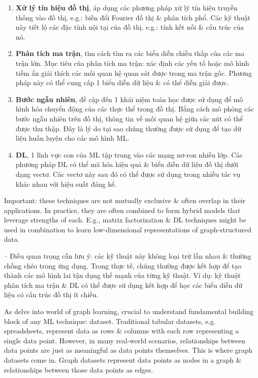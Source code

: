 \documentclass{article}
\begin{document}
\begin{itemize}
\begin{itemize}
        \begin{enumerate}
            \item {\bf Xử lý tín hiệu đồ thị}, áp dụng các phương pháp xử lý tín hiệu truyền thống vào đồ thị, e.g.: biến đổi Fourier đồ thị \& phân tích phổ. Các kỹ thuật này tiết lộ các đặc tính nội tại của đồ thị, e.g.: tính kết nối \& cấu trúc của nó.
            \item {\bf Phân tích ma trận}, tìm cách tìm ra các biểu diễn chiều thấp của các ma trận lớn. Mục tiêu của phân tích ma trận: xác định các yếu tố hoặc mô hình tiềm ẩn giải thích các mối quan hệ quan sát được trong ma trận gốc. Phương pháp này có thể cung cấp 1 biểu diễn dữ liệu \& có thể diễn giải được.
            \item {\bf Bước ngẫu nhiên}, đề cập đến 1 khái niệm toán học được sử dụng để mô hình hóa chuyển động của các thực thể trong đồ thị. Bằng cách mô phỏng các bước ngẫu nhiên trên đồ thị, thông tin về mối quan hệ giữa các nút có thể được thu thập. Đây là lý do tại sao chúng thường được sử dụng để tạo dữ liệu huấn luyện cho các mô hình ML.
            \item {\bf DL}, 1 lĩnh vực con của ML tập trung vào các mạng nơ-ron nhiều lớp. Các phương pháp DL có thể mã hóa hiệu quả \& biểu diễn dữ liệu đồ thị dưới dạng vectơ. Các vectơ này sau đó có thể được sử dụng trong nhiều tác vụ khác nhau với hiệu suất đáng kể.
        \end{enumerate}
        Important: these techniques are not mutually exclusive \& often overlap in their applications. In practice, they are often combined to form hybrid models that leverage strengths of each. E.g., matrix factorization \& DL techniques might be used in combination to learn low-dimensional representations of graph-structured data.

        -- Điều quan trọng cần lưu ý: các kỹ thuật này không loại trừ lẫn nhau \& thường chồng chéo trong ứng dụng. Trong thực tế, chúng thường được kết hợp để tạo thành các mô hình lai tận dụng thế mạnh của từng kỹ thuật. Ví dụ: kỹ thuật phân tích ma trận \& DL có thể được sử dụng kết hợp để học các biểu diễn dữ liệu có cấu trúc đồ thị ít chiều.

        As delve into world of graph learning, crucial to understand fundamental building block of any ML technique: dataset. Traditional tabular datasets, e.g. spreadsheets, represent data as rows \& columns with each row representing a single data point. However, in many real-world scenarios, relationships between data points are just as meaningful as data points themselves. This is where graph datasets come in. Graph datasets represent data points as nodes in a graph \& relationships between those data points as edges.


\end{itemize}
\end{itemize}
\end{document}
